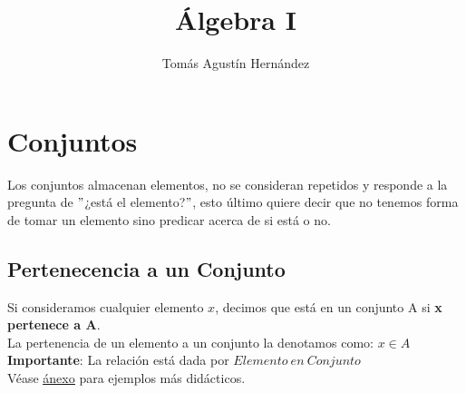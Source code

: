 \documentclass[10pt,a4paper]{article}
\title{Álgebra I}
\author{Tomás Agustín Hernández}
\date{}
\begin{document}
\maketitle

\begin{figure}[b]
    \centering
\end{figure}

\newpage
\section*{Conjuntos}
Los conjuntos almacenan elementos, no se consideran repetidos y responde a la pregunta de $"$¿está el elemento?$"$, esto último quiere decir que no tenemos forma de tomar un elemento sino predicar acerca de si está o no.
\subsection*{Pertenecencia a un Conjunto}
Si consideramos cualquier elemento $x$, decimos que está en un conjunto A si \textbf{x pertenece a A}. \\
La pertenencia de un elemento a un conjunto la denotamos como: $x \in A$ \\
\textbf{Importante}: La relación está dada por $Elemento \ en \ Conjunto$ \\
Véase \hyperref[subsec:pertenecencia_conjuntos]{\underline{ánexo}} para ejemplos más didácticos.
\end{document}
